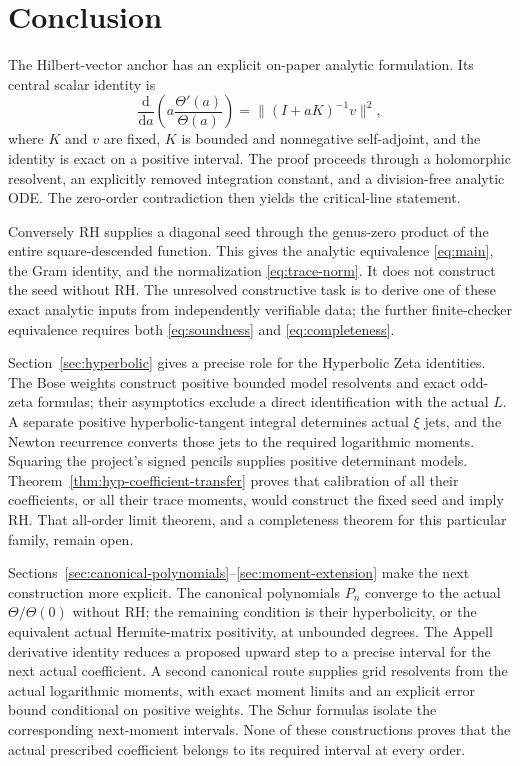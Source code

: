 \documentclass[11pt,a4paper]{article}
\numberwithin{equation}{section}
\theoremstyle{definition}
\theoremstyle{remark}
\newcommand{\norm}[1]{\lVert #1\rVert}
\begin{document}
\section{Conclusion}\label{sec:conclusion}

The Hilbert-vector anchor has an explicit on-paper analytic formulation. Its central scalar identity is
\[
\frac{\mathrm d}{\mathrm da}\left(a\frac{\Theta'(a)}{\Theta(a)}\right)
=\norm{(I+aK)^{-1}v}^2,
\]
where $K$ and $v$ are fixed, $K$ is bounded and nonnegative
self-adjoint, and the identity is exact on a positive interval.
The proof proceeds through a holomorphic resolvent, an explicitly
removed integration constant, and a division-free analytic ODE.
The zero-order contradiction then yields the critical-line statement.

Conversely RH supplies a diagonal seed through the genus-zero
product of the entire square-descended function. This gives the
analytic equivalence \eqref{eq:main}, the Gram identity, and the
normalization \eqref{eq:trace-norm}. It does not construct the seed
without RH. The unresolved constructive task is to derive one of
these exact analytic inputs from independently verifiable data;
the further finite-checker equivalence requires both
\eqref{eq:soundness} and \eqref{eq:completeness}.


Section~\ref{sec:hyperbolic} gives a precise role for the Hyperbolic
Zeta identities. The Bose weights construct positive bounded model
resolvents and exact odd-zeta formulas; their asymptotics exclude a
direct identification with the actual $L$. A separate positive
hyperbolic-tangent integral determines actual $\xi$ jets, and the
Newton recurrence converts those jets to the required logarithmic
moments. Squaring the project's signed pencils supplies positive
determinant models. Theorem~\ref{thm:hyp-coefficient-transfer} proves
that calibration of all their coefficients, or all their trace moments,
would construct the fixed seed and imply RH. That all-order limit
theorem, and a completeness theorem for this particular family,
remain open.



Sections~\ref{sec:canonical-polynomials}--\ref{sec:moment-extension}
make the next construction more explicit. The canonical polynomials
$P_n$ converge to the actual $\Theta/\Theta(0)$ without RH; the
remaining condition is their hyperbolicity, or the equivalent actual
Hermite-matrix positivity, at unbounded degrees. The Appell derivative
identity reduces a proposed upward step to a precise interval for the
next actual coefficient. A second canonical route supplies grid
resolvents from the actual logarithmic moments, with exact moment
limits and an explicit error bound conditional on positive weights.
The Schur formulas isolate the corresponding next-moment intervals.
None of these constructions proves that the actual prescribed
coefficient belongs to its required interval at every order.
\end{document}
